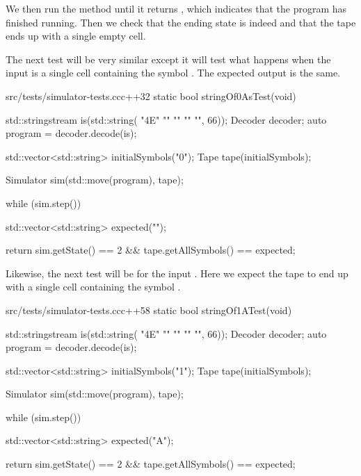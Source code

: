 We then run the  method until it returns , which indicates that the program has finished running. Then we check that the ending state is indeed  and that the tape ends up with a single empty cell.

The next test will be very similar except it will test what happens when the input is a single cell containing the symbol . The expected output is the same.

\begin{file}{src/tests/simulator-tests.cc}{c++}{32}
static bool stringOf0AsTest(void)
{
    std::stringstream is(std::string(
        "\x4E"
        ""
        ""
        ""
        "",
        66));
    Decoder decoder;
    auto program = decoder.decode(is);

    std::vector<std::string> initialSymbols({"0"});
    Tape tape(initialSymbols);

    Simulator sim(std::move(program), tape);

    while (sim.step())
    {
    }

    std::vector<std::string> expected({""});

    return sim.getState() == 2 && tape.getAllSymbols() == expected;
}
\end{file}

Likewise, the next test will be for the input . Here we expect the tape to end up with a single cell containing the symbol .

\begin{file}{src/tests/simulator-tests.cc}{c++}{58}
static bool stringOf1ATest(void)
{
    std::stringstream is(std::string(
        "\x4E"
        ""
        ""
        ""
        "",
        66));
    Decoder decoder;
    auto program = decoder.decode(is);

    std::vector<std::string> initialSymbols({"1"});
    Tape tape(initialSymbols);

    Simulator sim(std::move(program), tape);

    while (sim.step())
    {
    }

    std::vector<std::string> expected({"A"});

    return sim.getState() == 2 && tape.getAllSymbols() == expected;
}
\end{file}

